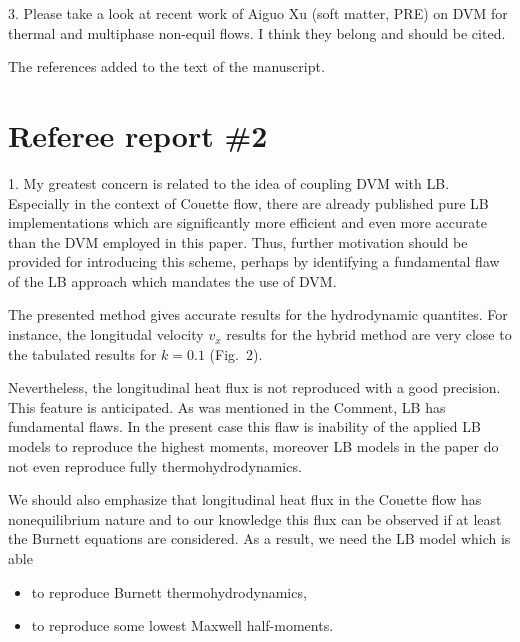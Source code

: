 \documentclass{article}
\begin{document}
\begin{leftbar}
\end{leftbar}

\begin{quoting}
    3. Please take a look at recent work of Aiguo Xu (soft matter, PRE) on DVM for
    thermal and multiphase non-equil flows. I think they belong and should be cited.
\end{quoting}

The references added to the text of the manuscript.

\begin{leftbar}
\end{leftbar}

\section*{Referee report \#2}

\begin{quoting}
    1. My greatest concern is related to the idea of coupling
    DVM with LB. Especially in the context of Couette flow,
    there are already published pure LB implementations which
    are significantly more efficient and even more accurate
    than the DVM employed in this paper. Thus, further
    motivation should be provided for introducing this scheme, perhaps by identifying a fundamental flaw of the LB approach which mandates the use of DVM.
\end{quoting}

The presented method gives accurate results for the hydrodynamic quantites.
For instance, the longitudal velocity $v_x$ results for the hybrid method
are very close to the tabulated results for $k=0.1$ (Fig.~2).

Nevertheless, the longitudinal heat flux is not reproduced with a good precision.
This feature is anticipated. As was mentioned in the Comment, LB has fundamental flaws.
In the present case this flaw is inability of the applied LB models to reproduce the highest moments,
moreover LB models in the paper do not even reproduce fully thermohydrodynamics.

We should also emphasize that longitudinal heat flux in the Couette flow has nonequilibrium nature
and to our knowledge this flux can be observed if at least the Burnett equations are considered.
As a result, we need the LB model which is able
\begin{itemize}
    \item to reproduce Burnett thermohydrodynamics,
    \item to reproduce some lowest Maxwell half-moments.
\end{itemize}
\end{document}
